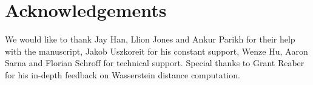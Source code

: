 \documentclass[english]{article}
\begin{document}
\section*{Acknowledgements}

We would like to thank Jay Han, Llion Jones and Ankur Parikh for their
help with the manuscript, Jakob Uszkoreit for his constant support,
Wenze Hu, Aaron Sarna and Florian Schroff for technical support. Special
thanks to Grant Reaber for his in-depth feedback on Wasserstein distance
computation.

\pagebreak{}

\end{document}
